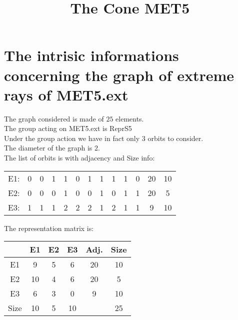 \documentclass[12pt]{article}
\title{The Cone MET5}
\begin{document}
\maketitle
\section{The intrisic informations concerning the graph of extreme rays of MET5.ext}
The graph considered is made of $25$ elements.\\
The group acting on MET5.ext is ReprS5\\
Under the group action we have in fact only $3$ orbits to consider.\\
The diameter of the graph is $2$.\\
The list of orbits is with adjacency and Size info:
\begin{center}
\scriptsize
\begin{tabular}{ccccccccccc|c|c}
E1:&0&0&1&1&0&1&1&1&1&0&20&10\\
E2:&0&0&0&1&0&0&1&0&1&1&20&5\\
E3:&1&1&1&2&2&2&1&2&1&1&9&10\\
\end{tabular}
\end{center}
The representation matrix is:
\begin{center}
\scriptsize
\begin{tabular}{|c|ccc|c|c|}
\hline
&E1&E2&E3&Adj.&Size\\
\hline
E1& 9& 5& 6&20&10\\
E2& 10& 4& 6&20&5\\
E3& 6& 3& 0&9&10\\
\hline
Size&10&5&10&&25\\
\hline
\end{tabular}
\end{center}
\end{document}
